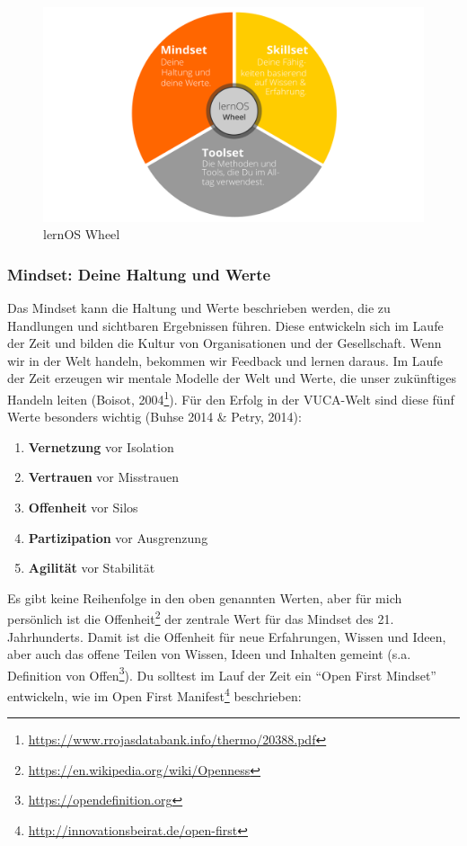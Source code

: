 \documentclass[
  ngerman,
  paper=a4,
,captions=tableheading
]{scrartcl}
\DeclareRobustCommand{\href}[2]{#2\footnote{\url{#1}}}
\providecommand{\tightlist}{%
  \setlength{\itemsep}{0pt}\setlength{\parskip}{0pt}}
\begin{document}
\begin{figure}
\centering
\includegraphics{./tex2pdf.-af94b87e0fdb9aa6/bd77dc0df1ce1b6dae68b830db7f4902bd9b84b4.png}
\caption{lernOS Wheel}
\end{figure}

\hypertarget{mindset-deine-haltung-und-werte}{%
\subsubsection{Mindset: Deine Haltung und
Werte}\label{mindset-deine-haltung-und-werte}}

Das Mindset kann die Haltung und Werte beschrieben werden, die zu
Handlungen und sichtbaren Ergebnissen führen. Diese entwickeln sich im
Laufe der Zeit und bilden die Kultur von Organisationen und der
Gesellschaft. Wenn wir in der Welt handeln, bekommen wir Feedback und
lernen daraus. Im Laufe der Zeit erzeugen wir mentale Modelle der Welt
und Werte, die unser zukünftiges Handeln leiten
(\href{https://www.rrojasdatabank.info/thermo/20388.pdf}{Boisot, 2004}).
Für den Erfolg in der VUCA-Welt sind diese fünf Werte besonders wichtig
(Buhse 2014 \& Petry, 2014):

\begin{enumerate}
\def\labelenumi{\arabic{enumi}.}
\tightlist
\item
  \textbf{Vernetzung} vor Isolation
\item
  \textbf{Vertrauen} vor Misstrauen
\item
  \textbf{Offenheit} vor Silos
\item
  \textbf{Partizipation} vor Ausgrenzung
\item
  \textbf{Agilität} vor Stabilität
\end{enumerate}

Es gibt keine Reihenfolge in den oben genannten Werten, aber für mich
persönlich ist die
\href{https://en.wikipedia.org/wiki/Openness}{Offenheit} der zentrale
Wert für das Mindset des 21. Jahrhunderts. Damit ist die Offenheit für
neue Erfahrungen, Wissen und Ideen, aber auch das offene Teilen von
Wissen, Ideen und Inhalten gemeint (s.a.
\href{https://opendefinition.org}{Definition von Offen}). Du solltest im
Lauf der Zeit ein ``Open First Mindset'' entwickeln, wie im
\href{http://innovationsbeirat.de/open-first}{Open First Manifest}
beschrieben:
\end{document}
